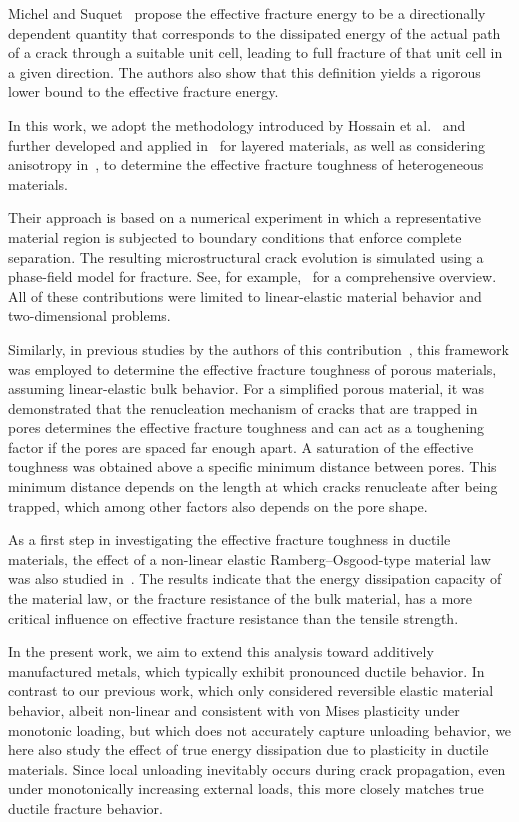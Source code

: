 \documentclass[pdflatex,sn-mathphys-num]{sn-jnl}%
\theoremstyle{thmstyleone}%
\theoremstyle{thmstyletwo}%
\theoremstyle{thmstylethree}%
\begin{document}
Michel and Suquet~\cite{michel_merits_2022} propose the effective fracture
energy to be a directionally dependent quantity that corresponds to
the dissipated energy of the actual path of a crack through a suitable unit cell,
leading to full fracture of that unit cell in a given direction.
The authors also show that this definition yields a rigorous lower bound to the effective fracture energy.

In this work, we adopt the methodology introduced
by Hossain et al.~\cite{hossain_effective_2014} and further
developed and applied in~\cite{hsueh_stress_2018} for layered materials,
as well as considering anisotropy in~\cite{brach_anisotropy_2019},
to determine the effective fracture toughness of heterogeneous materials.

Their approach is based on a numerical experiment in which a representative material
region is subjected to boundary conditions that enforce complete separation.
The resulting microstructural crack evolution is
simulated using a phase-field model for fracture.
See, for example,~\cite{ambati_review_2015} for a comprehensive overview.
All of these contributions were limited to linear-elastic material behavior and two-dimensional problems.

Similarly, in previous studies by the authors of this contribution~\cite{schlueter_ermittlung_2025,schluter_determination_2025},
this framework was employed to determine the effective fracture toughness of porous materials,
assuming linear-elastic bulk behavior. For a simplified porous material, it was demonstrated that
the renucleation mechanism of cracks that are trapped in pores
determines the effective fracture toughness
and can act as a toughening factor if the pores are
spaced far enough apart. A saturation of the effective toughness was obtained above
a specific minimum distance between pores. This minimum distance depends on the
length at which cracks renucleate after being trapped, which among other factors also
depends on the pore shape.

As a first step in investigating the effective fracture toughness in ductile materials,
the effect of a non-linear elastic Ramberg--Osgood-type material law was also studied in~\cite{schluter_influence_2025}.
The results indicate that the energy dissipation capacity of the material law,
or the fracture resistance of the bulk material,
has a more critical influence on effective fracture resistance than the tensile strength.

In the present work, we aim to extend this analysis
toward additively manufactured metals, which typically exhibit pronounced ductile behavior.
In contrast to our previous work, which only considered reversible elastic material behavior,
albeit non-linear and consistent with von Mises plasticity under monotonic loading,
but which does not accurately capture unloading behavior,
we here also study the effect of true energy dissipation due to plasticity in ductile materials.
Since local unloading inevitably occurs during crack propagation,
even under monotonically increasing external loads,
this more closely matches true ductile fracture behavior.
\end{document}
